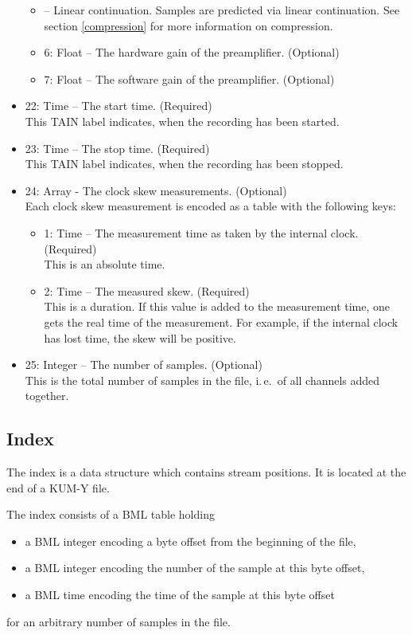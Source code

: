 \documentclass[DIV=10]{scrartcl}
\renewenvironment{quote}
{\list{}{
  \setlength{\rightmargin}{0cm}
  \setlength{\leftmargin}{0.75cm}}%
\item\relax\ignorespaces}
{\unskip\unskip\endlist}
\begin{document}
\begin{itemize}
\begin{itemize}
\begin{quote}
      2 – Linear continuation.
      Samples are predicted via linear continuation.
    \end{quote}
    See section \ref{compression} for more information on compression.
    \item 6: Float – The hardware gain of the preamplifier. (Optional)
    \item 7: Float – The software gain of the preamplifier. (Optional)
  \end{itemize}
  \item 22: Time – The start time. (Required)\\
  This TAIN label indicates, when the recording has been started.
  \item 23: Time – The stop time. (Required)\\
  This TAIN label indicates, when the recording has been stopped.
  \item 24: Array - The clock skew measurements. (Optional)\\
  Each clock skew measurement is encoded as a table with the following keys:
  \begin{itemize}
    \item 1: Time – The measurement time as taken by the internal clock. (Required)\\
    This is an absolute time.
    \item 2: Time – The measured skew. (Required)\\
    This is a duration.
    If this value is added to the measurement time, one gets the real time of the measurement.
    For example, if the internal clock has lost time, the skew will be positive.
  \end{itemize}
  \item 25: Integer – The number of samples. (Optional)\\
  This is the total number of samples in the file, i.\,e.\ of all channels added together.
\end{itemize}

\subsection{Index}

The index is a data structure which contains stream positions.
It is located at the end of a KUM-Y file.

The index consists of a BML table holding
\begin{itemize}
  \item a BML integer encoding a byte offset from the beginning of the file,
  \item a BML integer encoding the number of the sample at this byte offset,
  \item a BML time encoding the time of the sample at this byte offset
\end{itemize}
for an arbitrary number of samples in the file.
\end{document}
